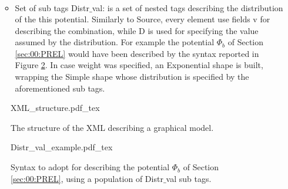 \begin{itemize}
\begin{itemize}
\begin{eqnarray}
\end{eqnarray}
\item Set of sub tags Distr$\_$val: is a set of nested tags describing the distribution of the this potential.
Similarly to Source, every element use fields v for describing the combination, while D is used for specifying the value assumed by the distribution.
For example the potential $\Phi _b$ of Section \ref{sec:00:PREL} would have been described by the syntax reported in Figure \ref{fig:00:XML_struct:Distr_val}.
In case weight was specified, an Exponential shape is built, wrapping the Simple shape whose distribution is specified by the aforementioned sub tags.
\end{itemize}
\end{itemize}

\begin{figure}
	\centering
\def\svgwidth{0.95 \columnwidth}
{XML_structure.pdf_tex} 
	\caption{The structure of the XML describing a graphical model.}
	\label{fig:00:XML_struct}
\end{figure} 

\begin{figure}
	\centering
\def\svgwidth{0.6 \columnwidth}
{Distr_val_example.pdf_tex} 
	\caption{Syntax to adopt for describing the potential $\Phi _b$ of Section \ref{sec:00:PREL}, using a population of Distr$\_$val sub tags.}
	\label{fig:00:XML_struct:Distr_val}
\end{figure} 
